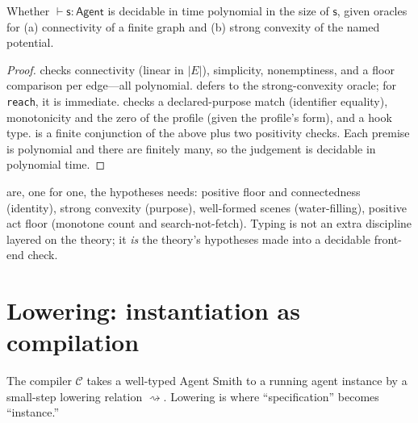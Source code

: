 \documentclass[11pt,twocolumn,a4paper]{article}
\newcommand{\E}{E}
\newcommand{\spec}{\mathsf{s}}         %
\newcommand{\compile}{\mathcal{C}}     %
\newcommand{\abs}[1]{\lvert#1\rvert}
\newcommand{\judge}{\vdash}
\newcommand{\lowers}{\rightsquigarrow} %
\begin{document}
\begin{theorem}
\label{thm:decidable}
Whether $\judge\spec:\mathsf{Agent}$ is decidable in time polynomial in the
size of $\spec$, given oracles for (a) connectivity of a finite graph and (b)
strong convexity of the named potential.
\end{theorem}

\begin{proof}
 checks connectivity (linear in $\abs\E$), simplicity,
nonemptiness, and a floor comparison per edge---all polynomial.
 defers to the strong-convexity oracle; for \texttt{reach},
it is immediate.  checks a declared-purpose match (identifier
equality), monotonicity and the zero of the profile (given the profile's
form), and a hook type.  is a finite conjunction of the above
plus two positivity checks. Each premise is polynomial and there are finitely
many, so the judgement is decidable in polynomial time.
\end{proof}

\begin{remark}
\label{rem:typing-is-wf}
 are, one for one, the
hypotheses  needs: positive floor and connectedness
(identity), strong convexity (purpose), well-formed scenes (water-filling),
positive act floor (monotone count and search-not-fetch). Typing is not an
extra discipline layered on the theory; it \emph{is} the theory's hypotheses
made into a decidable front-end check.
\end{remark}

\section{Lowering: instantiation as compilation}
\label{sec:lowering}

The compiler $\compile$ takes a well-typed Agent Smith to a running agent
instance by a small-step lowering relation $\lowers$. Lowering is where
``specification'' becomes ``instance.''
\end{document}
